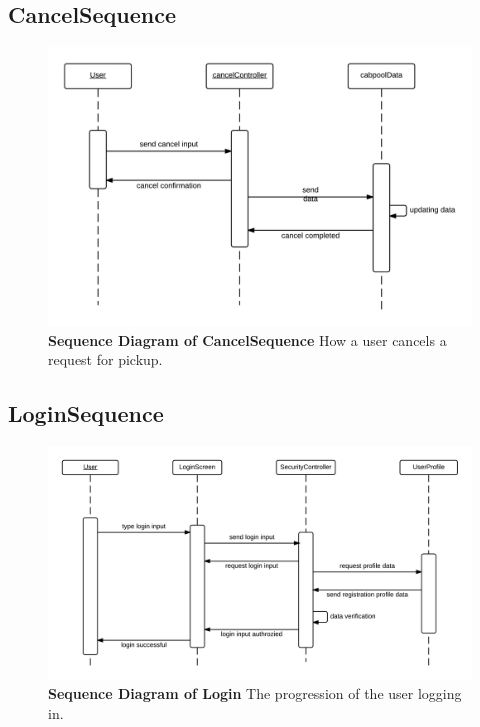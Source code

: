 \documentclass[]{article}
\begin{document}
\subsection{CancelSequence}

\begin{figure}[H]
\label{cancelSeq}
	\centering
	\includegraphics[width=1\textwidth]{CancelSequence.png}
	\caption{\textbf{Sequence Diagram of CancelSequence} How a user cancels a request for pickup.}
\end{figure}

\subsection{LoginSequence}

\begin{figure}[H]
\label{logSeq}
	\centering
	\includegraphics[width=1\textwidth]{LoginSequence.png}
	\caption{\textbf{Sequence Diagram of Login} The progression of the user logging in.}
\end{figure}
\end{document}
